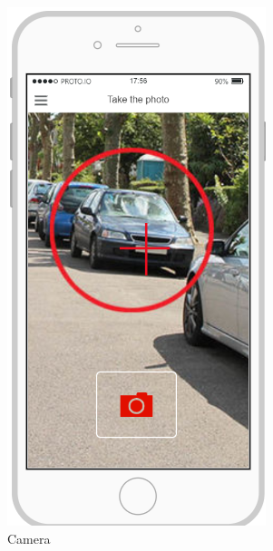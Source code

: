 \documentclass{article}
\begin{document}
\begin{figure}[H]
\begin{subfigure}[H]{0.25\linewidth}
					\includegraphics[width=\linewidth]{Images/Camera.png}
					\caption{Camera}
				\end{subfigure}
				\begin{subfigure}[H]{0.25\linewidth}

\end{subfigure}
\end{figure}
\end{document}
